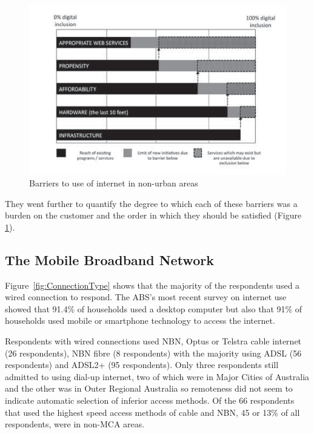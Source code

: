 \begin{figure}[ht]
\centering
\includegraphics[scale=.5]{figures/Barriers-to-use.png}
\caption{Barriers to use of internet in non-urban areas \cite{RefWorks:230}}
\label{fig:barrierstouse}
\end{figure}
They went further to quantify the degree to which each of these barriers was a burden on the customer and the order in which they should be satisfied (Figure \ref{fig:barrierstouse}).


\subsection{The Mobile Broadband Network}





Figure~\ref{fig:ConnectionType} shows that the majority of the respondents used a wired connection to respond. The ABS's most recent survey on internet use showed that 91.4\% of households used a desktop computer but also that 91\% of households used mobile or smartphone technology to access the internet\cite{RefWorks:459}. 

Respondents with wired connections used NBN, Optus or Telstra cable internet (26 respondents), NBN fibre (8 respondents) with the majority using ADSL (56 respondents) and ADSL2+ (95 respondents). Only three respondents still admitted to using dial-up internet, two of which were in Major Cities of Australia and the other was in Outer Regional Australia so remoteness did not seem to indicate automatic selection of inferior access methods. Of the 66 respondents that used the highest speed access methods of cable and NBN, 45 or 13\% of all respondents, were in non-MCA areas.


